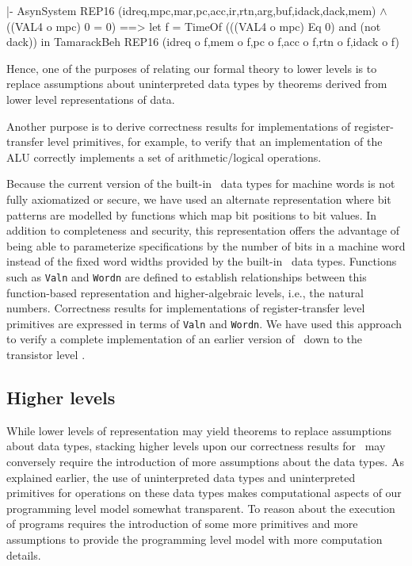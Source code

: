 \begintt
|- AsynSystem REP16 (idreq,mpc,mar,pc,acc,ir,rtn,arg,buf,idack,dack,mem) \(\wedge\)
   ((VAL4 o mpc) 0 = 0)
   ==>
   let f = TimeOf (((VAL4 o mpc) Eq 0) and (not dack)) in
   TamarackBeh REP16 (idreq o f,mem o f,pc o f,acc o f,rtn o f,idack o f)
\endtt

Hence,
one of the purposes of relating our formal theory to lower levels
is to replace assumptions about uninterpreted
data types by theorems derived
from lower level representations of data.

Another purpose is to derive correctness results for implementations
of register-transfer level primitives, for example,
to verify that an implementation of the ALU correctly implements
a set of arithmetic/logical operations.

Because the current version of
the built-in \HOL\ data types for machine words
is not fully axiomatized or secure,
we have used an alternate representation where bit patterns are modelled
by functions which map bit positions to bit values.
In addition to completeness and security,
this representation offers the advantage of
being able to parameterize specifications
by the number of bits in a machine word instead of the fixed word widths
provided by the built-in \HOL\ data types.
Functions such as \verb"Valn" and \verb"Wordn" are defined to
establish relationships between this
function-based representation and higher-algebraic levels, i.e.,
the natural numbers.
Correctness results
for implementations of
register-transfer level primitives
are expressed
in terms of \verb"Valn" and \verb"Wordn".
We have used this approach to verify a complete
implementation of an earlier version of \Tamarack\
down to the transistor level
\cite{Joyce:firstyear,Joyce:glasgow,Joyce:pisa,Joyce:vlsi89,Joyce:integration}.

\subsection{Higher levels}

While lower levels of representation may yield theorems to
replace assumptions about data types,
stacking higher levels upon
our correctness results for \Tamarack\ may conversely
require the introduction
of more assumptions about the data types.
As explained earlier,
the use of uninterpreted data types and uninterpreted primitives
for operations on these data types makes
computational aspects of our programming level model somewhat transparent.
To reason about the execution of programs requires
the introduction of some more primitives and more assumptions
to provide the programming level model
with more computation details.

